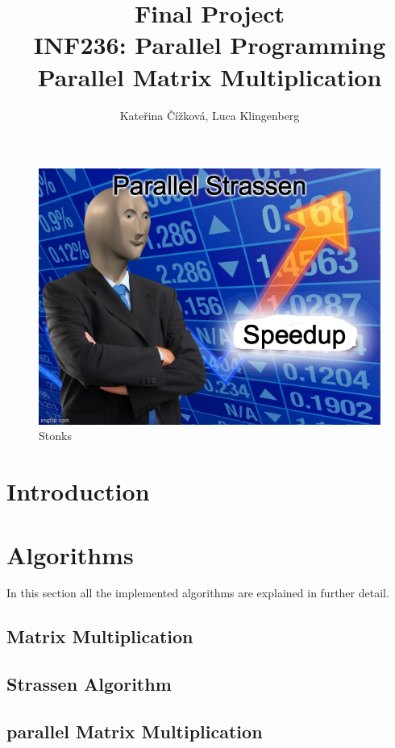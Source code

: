 \documentclass{article}
\title{Final Project\\ INF236: Parallel Programming\\ Parallel Matrix Multiplication}
\author{Kate\v{r}ina \v{C}\'{i}\v{z}kov\'{a}, Luca Klingenberg}
\begin{document}
\maketitle

\begin{figure}[htbp]
\centerline{\includegraphics[scale=.5]{58mo62.jpg}}
\caption{Stonks}
\label{fig}
\end{figure}

\section{Introduction}

\section{Algorithms}
In this section all the implemented algorithms are explained in further detail.

\subsection{Matrix Multiplication}

\subsection{Strassen Algorithm}

\subsection{parallel Matrix Multiplication}
\end{document}
